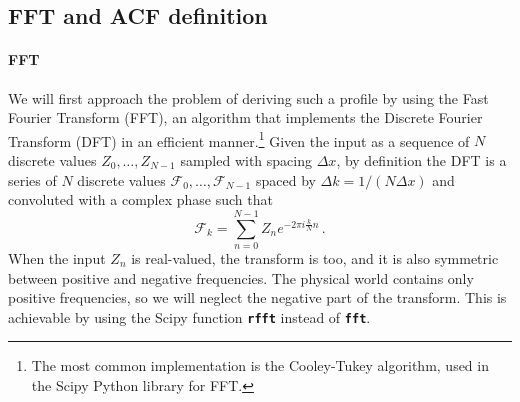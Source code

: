 \subsection{FFT and ACF definition}
\paragraph{FFT}
We will first approach the problem of deriving such a profile by using the Fast Fourier Transform (FFT), an algorithm that implements the Discrete Fourier Transform (DFT) in an efficient manner.\footnote{The most common implementation is the Cooley-Tukey algorithm, used in the Scipy Python library for FFT.} Given the input as a sequence of $N$ discrete values $Z_0,\dots,Z_{N-1}$ sampled with spacing $\Delta x$, by definition the DFT is a series of $N$ discrete values $\mathcal{F}_0,\dots,\mathcal{F}_{N-1}$ spaced by $\Delta k = 1/(N\Delta x)$ and convoluted with a complex phase such that
\begin{equation*}
    \mathcal{F}_k = \sum_{n=0}^{N-1} Z_n e^{-2\pi i \frac{k}{N}n}\, .
\end{equation*}
When the input $Z_n$ is real-valued, the transform is too, and it is also symmetric between positive and negative frequencies. The physical world contains only positive frequencies, so we will neglect the negative part of the transform. This is achievable by using the Scipy function \texttt{\textbf{rfft}} instead of \texttt{\textbf{fft}}.

